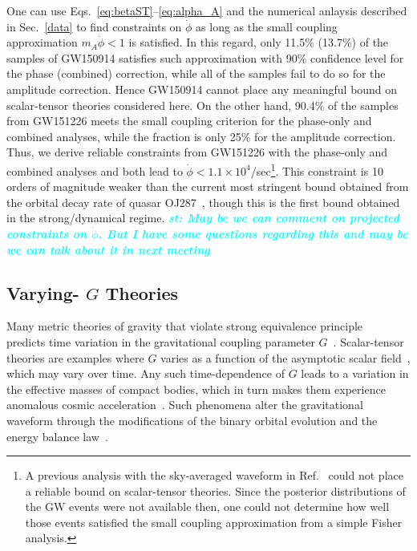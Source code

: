 \documentclass[prd,twocolumn,nofootinbib]{revtex4-1}
\newcommand{\st}[1]{\textcolor{cyan}{\it{\textbf{st: #1}}} }
\begin{document}
One can use Eqs.~\eqref{eq:betaST}--\eqref{eq:alpha_A} and the numerical anlaysis described in Sec.~\ref{data} to find constraints on $\dot{\phi}$ as long as the small coupling approximation $m_A\dot{\phi}<1$ is satisfied. In this regard, only 11.5\% (13.7\%) of the samples of GW150914 satisfies such approximation with 90\% confidence level for the phase (combined) correction, while all of the samples fail to do so for the amplitude correction. Hence GW150914 cannot place any meaningful bound on scalar-tensor theories considered here. On the other hand, 90.4\% of the samples from GW151226 meets the small coupling criterion for the phase-only and combined analyses, while the fraction is only 25\% for the amplitude correction. Thus, we derive reliable constraints from GW151226 with the phase-only and combined analyses and both lead to $\dot{\phi}<1.1\times10^4$/sec\footnote{A previous analysis with the sky-averaged waveform in Ref.~\cite{Yunes:2016jcc} could not place a reliable bound on scalar-tensor theories. Since the posterior distributions of the GW events were not available then, one could not determine how well those events satisfied the small coupling approximation from a simple Fisher analysis.}. This constraint is 10 orders of magnitude weaker than the current most stringent bound obtained from the orbital decay rate of quasar OJ287~\cite{Horbatsch:2011ye}, though this is the first bound obtained in the strong/dynamical regime. \st{May be we can comment on projected constraints on $\dot{\phi}$. But I have some questions regarding this and may be we can talk about it in next meeting}


\subsection{Varying- $G$ Theories}
Many metric theories of gravity that violate strong equivalence principle~\cite{DiCasola:2013iia,Will:2014kxa,0264-9381-7-10-007} predicts time variation in the gravitational coupling parameter $G$~\cite{uzan:2010pm}. Scalar-tensor theories are examples where $G$ varies as a function of the asymptotic scalar field~\cite{Will2006}, which may vary over time. Any such time-dependence of $G$ leads to a variation in the effective masses of compact bodies, which in turn makes them experience anomalous cosmic acceleration~\cite{PhysRevLett.65.953}. Such phenomena alter the gravitational waveform through the modifications of the binary orbital evolution and the energy balance law~\cite{Tahura:2018zuq}.
\end{document}
